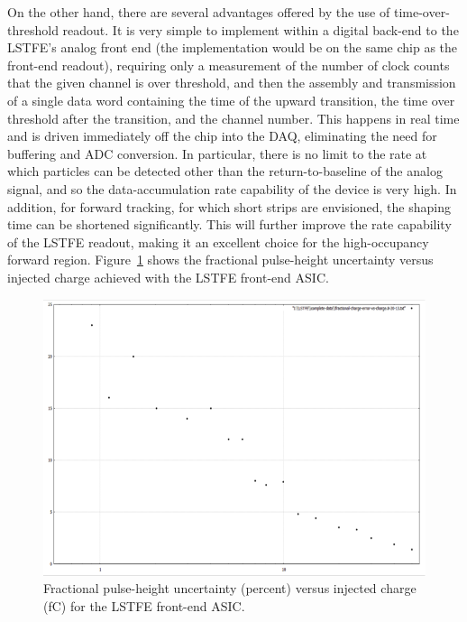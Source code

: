 On the other hand, there are several advantages offered by the use of time-over-threshold readout. It is very simple
to implement within a digital back-end to the LSTFE's analog front end (the implementation would be on the same chip
as the front-end readout), requiring only a measurement of the number of clock counts that the given channel is over
threshold, and then the assembly and transmission of a
single data word containing the time of the upward transition, the time over threshold after the transition, and the
channel number. This happens in real time and is driven immediately off the chip into the DAQ, eliminating the need
for buffering and ADC conversion. In particular, there is no limit to the rate at which particles can be detected
other than the return-to-baseline of the analog signal, and so the data-accumulation rate capability of the device
is very high. In addition, for forward tracking, for which short strips are envisioned, the shaping time can be
shortened significantly. This will further improve the rate capability of the LSTFE readout, making it an excellent
choice for the high-occupancy forward region.
Figure~\ref{fig:Tracker:SCIPP:LSTFE} shows the fractional pulse-height uncertainty versus
injected charge achieved with the LSTFE front-end ASIC.

\begin{figure}
\includegraphics{Tracker/SCIPPTracking/SCIPPTracking}
\caption{Fractional pulse-height uncertainty (percent) versus injected charge (fC) for the LSTFE front-end ASIC.}
\label{fig:Tracker:SCIPP:LSTFE}
\end{figure}

